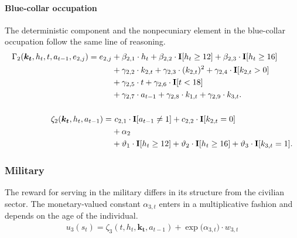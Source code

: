 \paragraph{Blue-collar occupation} The deterministic component and the nonpecuniary element in the blue-collar occupation follow the same line of reasoning.
%
\begin{align*} 
    \Gamma_2(\bm{k_t}, h_t, t, a_{t-1}, e_{2,j}) = e_{2,j} & + \beta_{2,1} \cdot h_t + \beta_{2, 2} \cdot {\textbf{I}}[h_t \geq 12] + \beta_{2,3} \cdot {\textbf{I}}[h_t\geq 16] \\
    							 & + \gamma_{2, 2} \cdot  k_{2,t} + \gamma_{2,3} \cdot  (k_{2,t})^2 + \gamma_{2,4} \cdot  {\textbf{I}}[k_{2,t} > 0] \\
                                   & + \gamma_{2,5} \cdot  t + \gamma_{2,6} \cdot {\textbf{I}}[t < 18] \\
                                  & + \gamma_{2,7} \cdot  a_{t-1} + \gamma_{2,8} \cdot  k_{1,t} + \gamma_{2,9} \cdot  k_{3,t}. \\
                                  &\\
\zeta_{2}( \bm{k_t}, h_t, a_{t-1} ) = &~c_{2,1} \cdot {\textbf{I}}[a_{t-1} \neq 1] + c_{2,2} \cdot {\textbf{I}}[k_{2,t} = 0] \\
                            & + \alpha_2 \\
                            & + \vartheta_1 \cdot {\textbf{I}}[h_t \geq 12] + \vartheta_2 \cdot {\textbf{I}}[h_t \geq 16] + \vartheta_3 \cdot {\textbf{I}}[k_{3,t} = 1].
\end{align*}



\FloatBarrier\subsubsection{Military}
The reward for serving in the military differs in its structure from the civilian sector. The monetary-valued constant $\alpha_{3,t}$ enters in a multiplicative fashion and depends on the age of the individual.
%
\begin{align}\label{eq:RewardMilitary}
    u_{3}(s_t) = \zeta_3(t, h_t, \bm{k_t}, a_{t -1})  + \exp \big( \alpha_{3, t} \big) \cdot w_{3,t}
\end{align}

